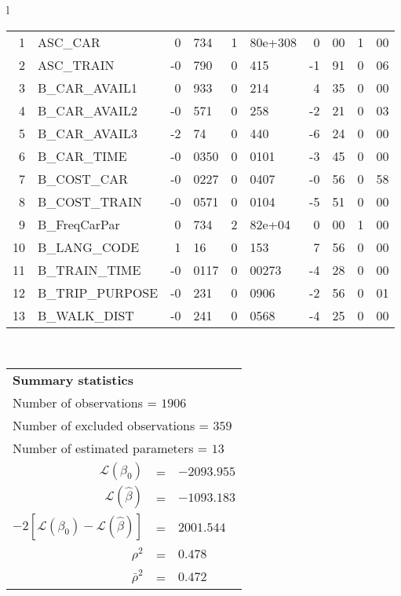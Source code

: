 \begin{tabular}{l}
\begin{tabular}{rlr@{.}lr@{.}lr@{.}lr@{.}l}
1 & ASC_CAR & 0&734 & 1&80e+308 & 0&00 & 1&00\\
2 & ASC_TRAIN & -0&790 & 0&415 & -1&91 & 0&06\\
3 & B_CAR_AVAIL1 & 0&933 & 0&214 & 4&35 & 0&00\\
4 & B_CAR_AVAIL2 & -0&571 & 0&258 & -2&21 & 0&03\\
5 & B_CAR_AVAIL3 & -2&74 & 0&440 & -6&24 & 0&00\\
6 & B_CAR_TIME & -0&0350 & 0&0101 & -3&45 & 0&00\\
7 & B_COST_CAR & -0&0227 & 0&0407 & -0&56 & 0&58\\
8 & B_COST_TRAIN & -0&0571 & 0&0104 & -5&51 & 0&00\\
9 & B_FreqCarPar & 0&734 & 2&82e+04 & 0&00 & 1&00\\
10 & B_LANG_CODE & 1&16 & 0&153 & 7&56 & 0&00\\
11 & B_TRAIN_TIME & -0&0117 & 0&00273 & -4&28 & 0&00\\
12 & B_TRIP_PURPOSE & -0&231 & 0&0906 & -2&56 & 0&01\\
13 & B_WALK_DIST & -0&241 & 0&0568 & -4&25 & 0&00\\
\hline
\end{tabular}
\\
\begin{tabular}{rcl}
\multicolumn{3}{l}{\bf Summary statistics}\\
\multicolumn{3}{l}{ Number of observations = $1906$} \\
\multicolumn{3}{l}{ Number of excluded observations = $359$} \\
\multicolumn{3}{l}{ Number of estimated  parameters = $13$} \\
 $\mathcal{L}(\beta_0)$ &=&  $-2093.955$ \\
 $\mathcal{L}(\hat{\beta})$ &=& $-1093.183 $  \\
 $-2[\mathcal{L}(\beta_0) -\mathcal{L}(\hat{\beta})]$ &=& $2001.544$ \\
    $\rho^2$ &=&   $0.478$ \\
    $\bar{\rho}^2$ &=&    $0.472$ \\
\end{tabular}
  \end{tabular}
